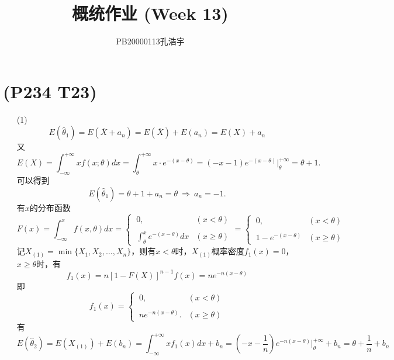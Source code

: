 \documentclass{article}
\title{概统作业 (Week 13)}
\author{PB20000113孔浩宇}
\begin{document}
\maketitle
\section{(P234 T23)}  %
\begin{enumerate}
    \item [(1)]
    \[
        E(\widehat{\theta}_1)    
        = E(\overline{X} + a_n)
        = E(\overline{X}) + E(a_n)
        = E(X) + a_n
    \]
    又
    \[
        E(X)
        = \int_{-\infty}^{+\infty} x f(x ; \theta) dx
        = \int_{\theta}^{+\infty} x\cdot e^{-(x-\theta)}
        = (-x-1) e^{-(x-\theta)} {\big|}_{\theta}^{+\infty}
        = \theta + 1.
    \]
    可以得到
    \[
        E(\widehat{\theta}_1)    
        = \theta + 1 + a_n
        = \theta
        \ \Rightarrow\ 
        a_n = -1 .
    \]
    有$x$的分布函数
    \[
        F(x)
        = \int_{-\infty}^{x} f(x,\theta) dx
        = 
        \begin{cases}
            \ 0, & (x < \theta) \\
            \\
            \ \displaystyle{\int_{\theta}^{x} e^{-(x - \theta)} dx} & (x \geq \theta)
        \end{cases}  
        = 
        \begin{cases}
            \ 0, & (x < \theta) \\
            \\
            \ 1 - e^{-(x - \theta)} & (x \geq \theta)
        \end{cases} 
    \]
    记$X_{(1)} = \min \{ X_1, X_2, \ldots, X_n \}$，则有$x < \theta$时，$X_{(1)}$概率密度$f_{1} (x) = 0$，$x \geq \theta$时，有
    \[
        f_{1} (x)
        = n {\left[ 1 - F(X) \right]}^{n-1} f(x)
        = n e^{- n (x - \theta)} 
    \]
    即
    \[
        f_{1} (x) = 
        \begin{cases}
            \ 0, & (x < \theta) \\
            \\
            \ n e^{-n(x-\theta)}. & (x\geq \theta)
        \end{cases}    
    \]
    有
    \[
        E(\widehat{\theta}_2)
        = E(X_{(1)}) + E(b_n)    
        = \int_{-\infty}^{+\infty} x f_{1}(x) dx + b_n
        = \left(-x - \frac{1}{n}\right) e^{-n(x-\theta)} {\big|}_{\theta}^{+\infty} + b_n
        = \theta + \frac{1}{n} + b_n 
\]
\end{enumerate}
\end{document}
